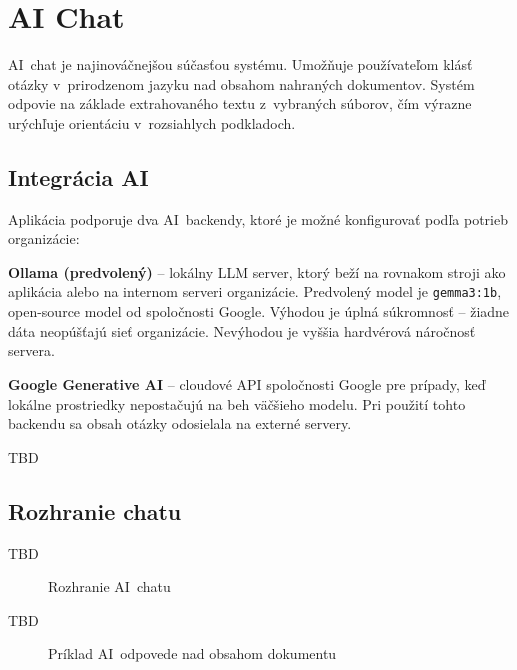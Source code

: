 \chapter{AI Chat}

        AI~chat je najinováčnejšou súčasťou systému. Umožňuje používateľom klásť
otázky v~prirodzenom jazyku nad obsahom nahraných dokumentov.
Systém odpovie na základe extrahovaného textu z~vybraných súborov, čím výrazne
urýchľuje orientáciu v~rozsiahlych podkladoch.

\section{Integrácia AI}

        Aplikácia podporuje dva AI~backendy, ktoré je možné konfigurovať podľa potrieb
organizácie:

        \textbf{Ollama (predvolený)} -- lokálny LLM server, ktorý beží na rovnakom
stroji ako aplikácia alebo na internom serveri organizácie. Predvolený model je
\texttt{gemma3:1b}, open-source model od spoločnosti Google. Výhodou je úplná
súkromnosť -- žiadne dáta neopúšťajú sieť organizácie. Nevýhodou je vyššia
hardvérová náročnosť servera.

        \textbf{Google Generative AI} -- cloudové API spoločnosti Google pre prípady,
keď lokálne prostriedky nepostačujú na beh väčšieho modelu. Pri použití tohto
backendu sa obsah otázky odosielala na externé servery.

  TBD

\section{Rozhranie chatu}

        TBD

\begin{figure}[H]
  \centering
  \caption{Rozhranie AI~chatu}
  \label{fig:ai_chat}
\end{figure}

        TBD

\begin{figure}[H]
  \centering
  \caption{Príklad AI~odpovede nad obsahom dokumentu}
  \label{fig:ai_odpoved}
\end{figure}
